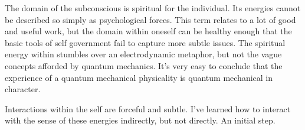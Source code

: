 

The domain of the subconscious is spiritual for the individual.  Its
energies cannot be described so simply as psychological forces.  This
term relates to a lot of good and useful work, but the domain within
oneself can be healthy enough that the basic tools of self government
fail to capture more subtle issues.  The spiritual energy within
stumbles over an electrodynamic metaphor, but not the vague concepts
afforded by quantum mechanics.  It's very easy to conclude that the
experience of a quantum mechanical physicality is quantum mechanical
in character.

Interactions within the self are forceful and subtle.  I've learned
how to interact with the sense of these energies indirectly, but not
directly.  An initial step.

\bye

